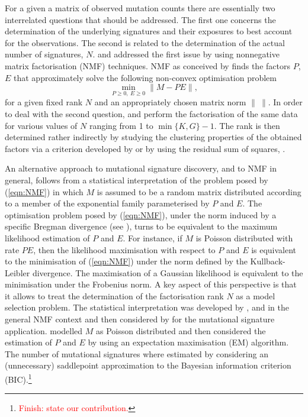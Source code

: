 \documentclass{bioinfo}
\begin{document}
For a given a matrix of observed mutation counts there are essentially
two interrelated questions that should be addressed. The first one
concerns the determination of the underlying signatures and their
exposures to best account for the observations. The second is related
to the determination of the actual number of signatures,
$N$. \cite{NCell} and \cite{A} addressed the first issue by using
nonnegative matrix factorisation (NMF) techniques.  NMF as conceived
by \cite{LS} finds the factors $P$, $E$ that approximately solve the
following non-convex optimisation problem
\begin{equation}
 \label{eqn:NMF}
  \min_{P\geqslant 0,\ E\geqslant 0}\|M - PE\|,
\end{equation}
for a given fixed rank $N$ and an appropriately chosen matrix norm
$\|\ \|$.  In order to deal with the second question, \cite{NCell} and
\cite{A} perform the factorisation of the same data for various
values of $N$ ranging from 1 to $\min\{K, G\}-1$. The rank is then
determined rather indirectly by studying the clustering properties of
the obtained factors via a criterion developed by \cite{BTGM} or by 
using the residual sum of squares, \cite{HMSG}.


An alternative approach to mutational signature discovery, and to NMF
in general, follows from a statistical interpretation of the problem
posed by (\ref{eqn:NMF}) in which $M$ is assumed to be a random matrix
distributed according to a member of the exponential family
parameterised by $P$ and $E$. The optimisation problem posed by
(\ref{eqn:NMF}), under the norm induced by a specific Bregman
divergence (see \citealp{BMD}), turns to be equivalent to the maximum
likelihood estimation of $P$ and $E$.  For instance, if $M$ is Poisson
distributed with rate $PE$, then the likelihood maximisation with
respect to $P$ and $E$ is equivalent to the minimisation of
(\ref{eqn:NMF}) under the norm defined by the Kullback-Leibler
divergence. The maximisation of a Gaussian likelihood is equivalent to
the minimisation under the Frobenius norm. A key aspect of this
perspective is that it allows to treat the determination of the
factorisation rank $N$ as a model selection problem. The statistical
interpretation was developed by \cite{C}, \cite{FC} and \cite{SWK} in
the general NMF context and then considered by \cite{FICMV} for the
mutational signature application. \cite{FICMV} modelled $M$ as Poisson
distributed and then considered the estimation of $P$ and $E$ by using
an expectation maximisation (EM) algorithm. The number of mutational
signatures where estimated by considering an (unnecessary) saddlepoint
approximation to the Bayesian information criterion
(BIC).\footnote{\textcolor{red}{Finish: state our contribution.}}
\end{document}
